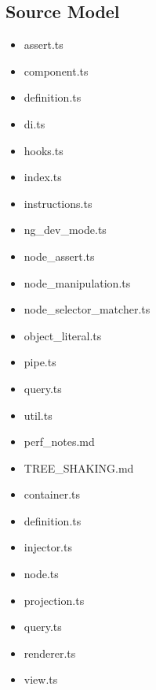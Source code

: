 \subsection{Source Model}


\begin{itemize}
  \item assert.ts
  \item component.ts
  \item definition.ts
  \item di.ts
  \item hooks.ts
  \item index.ts
  \item instructions.ts
  \item ng\_dev\_mode.ts
  \item node\_assert.ts
  \item node\_manipulation.ts
  \item node\_selector\_matcher.ts
  \item object\_literal.ts
  \item pipe.ts
  \item query.ts
  \item util.ts
\end{itemize}


\begin{itemize}
  \item perf\_notes.md
  \item TREE\_SHAKING.md
\end{itemize}


\begin{itemize}
  \item container.ts
  \item definition.ts
  \item injector.ts
  \item node.ts
  \item projection.ts
  \item query.ts
  \item renderer.ts
  \item view.ts
\end{itemize}




